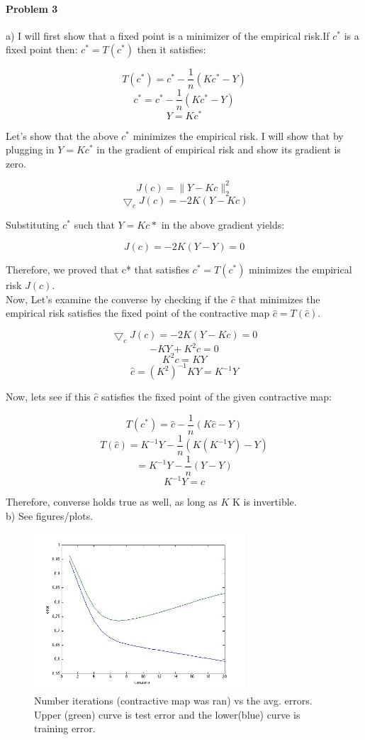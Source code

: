 \documentclass[12pt]{report}
\begin{document}
\paragraph{Problem 3}
a)
I will first show that a fixed point is a minimizer of the empirical risk.If $c^*$ is a fixed point then: $ c^* = T(c^*) $ then it satisfies:

$$ T(c^*) = c^* - \frac{1}{n}(Kc^*-Y) $$ 
$$ c^* = c^* - \frac{1}{n}(Kc^*-Y) $$
$$ Y = Kc^* $$

Let's show that the above $c^*$ minimizes the empirical risk. I will show that by plugging in $ Y = Kc^* $ in the gradient of empirical risk and show its gradient is zero.

$$ J(c) = \|Y-Kc\|_2^2 $$
$$ \bigtriangledown_c J(c) = -2K(Y-Kc)$$

Substituting $c^*$ such that $Y=Kc*$ in the above gradient yields:

$$ J(c) = -2K(Y-Y) =0 $$

Therefore, we proved that c* that satisfies $c^* = T(c^*) $ minimizes the empirical risk $J(c)$. \\

Now, Let's examine the converse by checking if the $\hat{c}$ that minimizes the empirical risk satisfies the fixed point of the contractive map $ \hat{c}= T(\hat{c}) $.

$$ \bigtriangledown_c J(c) = -2K(Y-Kc) = 0 $$
$$ -KY + K^2c = 0$$
$$K^2c =  KY$$
$$ \hat{c} = (K^2)^{-1}KY = K^{-1}Y$$

Now, lets see if this $\hat{c}$ satisfies the fixed point of the given contractive map:

$$ T(c^*) = \hat{c} - \frac{1}{n}(K\hat{c}-Y) $$ 
$$ T(\hat{c}) = K^{-1}Y - \frac{1}{n} (K(K^{-1}Y) - Y)$$
$$ = K^{-1}Y - \frac{1}{n}(Y-Y) $$
$$ K^{-1}Y = \hat{c}$$

Therefore, converse holds true as well, as long as $K$ K is invertible. \\

b) See figures/plots.

\begin{figure}
\centering
\includegraphics[width=0.7\textwidth]{3b.jpg}
\caption{\label{fig:errors} Number iterations (contractive map was ran) vs the avg. errors. Upper (green) curve is test error and the lower(blue) curve is training error.}
\end{figure}
\end{document}
